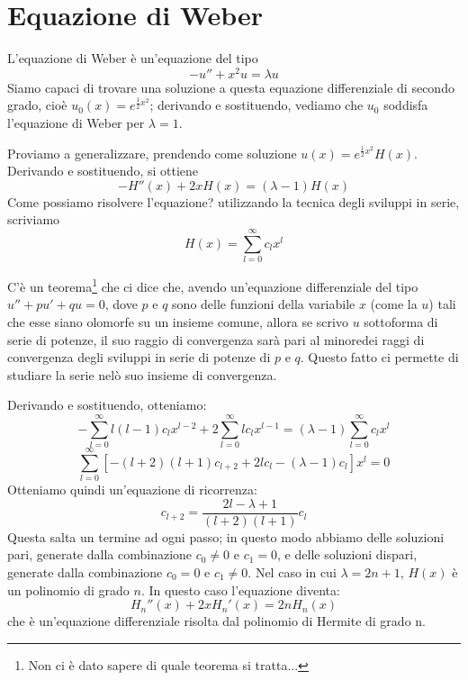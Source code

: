 \section{Equazione di Weber}

L'equazione di Weber è un'equazione del tipo
\begin{equation}
-u'' + x^2 u = \lambda u
\end{equation}
Siamo capaci di trovare una soluzione a questa equazione differenziale di secondo grado, cioè $u_0(x)=e^{\frac{1}{2} x^2}$; derivando e sostituendo, vediamo che $u_0$ soddisfa l'equazione di Weber per $\lambda=1$.

Proviamo a generalizzare, prendendo come soluzione  $u(x)=e^{\frac{1}{2} x^2} H(x)$. Derivando e sostituendo, si ottiene
$$-H''(x)+2xH(x)=(\lambda -1)H(x)$$
Come possiamo risolvere l'equazione? utilizzando la tecnica degli sviluppi in serie, scriviamo
$$H(x)=\sum_{l=0} ^{\infty} c_l x^l$$
\begin{osservazione}
C'è un teorema\footnote{Non ci è dato sapere di quale teorema si tratta...} che ci dice che, avendo un'equazione differenziale del tipo $u''+pu'+qu=0$, dove $p$ e $q$ sono delle funzioni della variabile $x$ (come la $u$) tali che esse siano olomorfe su un insieme comune, allora se scrivo $u$ sottoforma di serie di potenze, il suo raggio di convergenza sarà pari al minoredei raggi di convergenza degli sviluppi in serie di potenze di $p$ e $q$. Questo fatto ci permette di studiare la serie nelò suo insieme di convergenza.
\end{osservazione}
Derivando e sostituendo, otteniamo:
$$-\sum_{l=0} ^{\infty} l(l-1)c_l x^{l-2} +2\sum_{l=0} ^{\infty} l c_l x^{l-1} =(\lambda -1) \sum_{l=0} ^{\infty} c_l x^l$$
$$\sum_{l=0} ^{\infty} \left[-(l+2)(l+1)c_{l+2} + 2l c_l - (\lambda -1) c_l  \right]x^l=0$$
Otteniamo quindi un'equazione di ricorrenza:
$$c_{l+2} =\frac{2l - \lambda +1}{(l+2)(l+1)} c_l$$
Questa salta un termine ad ogni passo; in questo modo abbiamo delle soluzioni pari, generate dalla combinazione $c_0 \neq 0$ e $c_1=0$, e delle soluzioni dispari, generate dalla combinazione $c_0=0$ e $c_1 \neq 0$. 
Nel caso in cui $\lambda=2n+1$, $H(x)$ è un polinomio di grado $n$. In questo caso l'equazione diventa:
$$H_n''(x) +2xH_n'(x)=2nH_n(x)$$
che è un'equazione differenziale risolta dal polinomio di Hermite di grado n.

